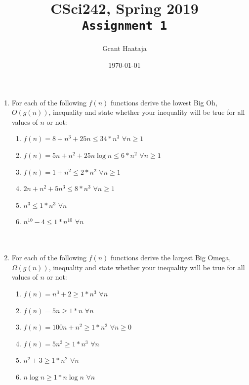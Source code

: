 \documentclass[11pt,final,twoside]{article} %
\title{CSci242, Spring 2019\\
	\texttt{Assignment 1}}
\author{Grant Haataja}
\date{\today}
\begin{document}
	\maketitle

\begin{enumerate}
	\item For each of the following $f(n)$ functions derive the lowest Big Oh, $O(g(n))$, inequality and state whether your inequality will be true for all values of $n$ or not:
	\begin{enumerate}
		\item $f(n) = 8 + n^3 + 25n \leq 34 * n^3$ $\forall n \geq 1$
		\item $f(n) = 5n + n^2 + 25n\log n \leq 6 * n^2$ $\forall n \geq 1$ 
		\item $f(n) = 1 + n^2 \leq 2 * n^2$ $\forall n \geq 1$ 
		\item $2n + n^2 + 5n^3 \leq 8 * n^3$ $\forall n \geq 1$ 
		\item $n^3 \leq 1 * n^3$ $\forall n$ 
		\item $n^{10} - 4 \leq 1 * n^{10} $ $\forall n$ \\\\\\	
	\end{enumerate}
	\item For each of the following $f(n)$ functions derive the largest Big Omega, $\Omega(g(n))$, inequality and state whether your inequality will be true for all values of $n$ or not:
	\begin{enumerate}
		\item $f(n) = n^3 + 2 \geq 1 * n^3$ $\forall n$ 
		\item $f(n) = 5n \geq 1 * n$ $\forall n$ 
		\item $f(n) = 100n + n^2 \geq 1 * n^2$ $\forall n \geq 0$ 
		\item $f(n) = 5n^3 \geq 1 * n^3$ $\forall n$ 
		\item $n^2 + 3 \geq 1 * n^2$ $\forall n$ 
		\item $n\log n \geq 1 * n\log n$ $ \forall n$ 
	\end{enumerate}
\end{enumerate}
	
\end{document}
